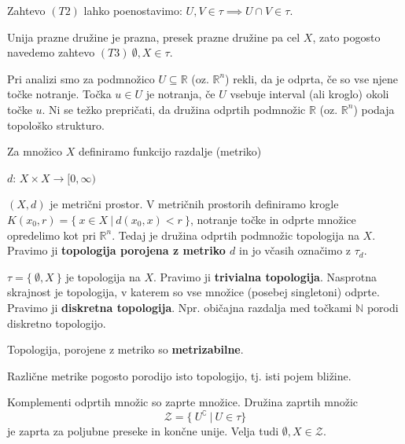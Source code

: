 \documentclass[11pt, a4paper]{article}
\begin{document}
    Zahtevo \((T2)\) lahko poenostavimo: \(U,V \in \tau \implies U \cap V \in \tau\).
    
    \par
    Unija prazne družine je prazna, presek prazne družine pa cel \(X\), zato pogosto navedemo zahtevo \((T3)\ \emptyset, X \in \tau\).

    \begin{example}
        Pri analizi smo za podmnožico \(U \subseteq \mathbb{R}\) (oz. \(\mathbb{R}^n\)) rekli, da je odprta, če so vse njene točke notranje. Točka \(u \in U\) je notranja, če \(U\) vsebuje interval (ali kroglo) okoli točke \(u\). Ni se težko prepričati, da družina odprtih podmnožic \(\mathbb{R}\) (oz. \(\mathbb{R}^n\)) podaja topološko strukturo.
    \end{example}

    \begin{example}
        Za množico \(X\) definiramo funkcijo razdalje (metriko) 
        \begin{center}
            \(d\): \(X \times X \to [0, \infty)\)
        \end{center} 
        \((X,d)\) je metrični prostor. V metričnih prostorih definiramo krogle \(K(x_0,r)=\{\ x \in X\ |\ d(x_0,x) < r\ \}\), notranje točke in odprte množice opredelimo kot pri \(\mathbb{R}^n\). Tedaj je družina odprtih podmnožic topologija na \(X\). Pravimo ji \textbf{topologija porojena z metriko \(d\)} in jo včasih označimo z \(\tau_d\).
    \end{example}

    \begin{example}
        \(\tau=\{\ \emptyset, X\ \}\) je topologija na \(X\). Pravimo ji \textbf{trivialna topologija}. Nasprotna skrajnost je topologija, v katerem so vse množice (posebej singletoni) odprte. Pravimo ji \textbf{diskretna topologija}. Npr. običajna razdalja med točkami \(\mathbb{N}\) porodi diskretno topologijo.
    \end{example}

    \begin{definition}
        Topologija, porojene z metriko so \textbf{metrizabilne}. 
    \end{definition}
    Različne metrike pogosto porodijo isto topologijo, tj. isti pojem bližine.

    \par
    Komplementi odprtih množic so zaprte množice. Družina zaprtih množic 
    \[\mathscr{Z}=\{\ U^\complement\ |\ U \in \tau \}\]
    je zaprta za poljubne preseke in končne unije. Velja tudi \(\emptyset, X \in \mathscr{Z}\).
\end{document}
